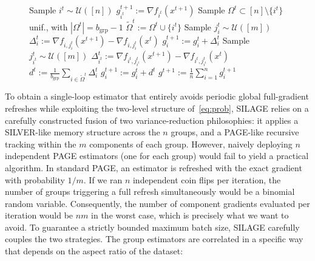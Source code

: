 \documentclass{article}
\newcommand{\cO}{{\cal O}}
\newcommand{\eqdef}{:=}
\newcommand{\rb}[1]{\left(#1\right)}
\theoremstyle{plain}
\newcommand{\algname}[1]{{\sf\scalefont{0.88}\color{mydarkgreen}#1}\xspace}
\newcommand{\algno}{{\sf\scalefont{0.88}\color{mydarkgreen}SILAGE}\xspace}
\def\algname#1{#1}%
\begin{document}
\begin{figure}[t]
\begin{minipage}[t]{0.485\textwidth}
\begin{algorithm}[H]
\begin{algorithmic}[1]
        \STATE Sample $i^t \sim \mathcal{U}([n])$
        \STATE $g_{i^t}^{t+1} \eqdef \nabla f_{i^t}(x^{t+1})$ \hfill {}
        \STATE Sample $\Omega^t \subset [n] \!\setminus \!\{i^t\}$ unif., with $|\Omega^t| = b_{\mathrm{grp}}-1$%
        \STATE $\tilde{\Omega}^t \eqdef \Omega^t \cup \{i^t\}$
            \STATE Sample $j_i^t \sim \mathcal{U}([m])$
            \STATE $\Delta_i^t \eqdef \nabla f_{i,j_i^t}(x^{t+1}) - \nabla f_{i,j_i^t}(x^t)$
            \STATE $g_i^{t+1} \eqdef g_i^t + \Delta_i^t$ \hfill {}
        \ENDFOR
        \STATE Sample $j_{i^t}^t \sim \mathcal{U}([m])$
        \STATE $\Delta_{i^t}^t \eqdef \nabla f_{i^t,j_{i^t}^t}(x^{t+1}) - \nabla f_{i^t,j_{i^t}^t}(x^t)$
        \STATE $d^t \eqdef \frac{1}{b_{\mathrm{grp}}}\sum_{i \in \tilde{\Omega}^t} \Delta_i^t$ \hfill {}
            \STATE $g_i^{t+1} \eqdef g_i^t + d^t$ %
        \ENDFOR
        \STATE $g^{t+1} \eqdef \frac{1}{n}\sum_{i=1}^n g_i^{t+1}$
    \ENDFOR
\end{algorithmic}
\end{algorithm}
\end{minipage}
\end{figure}


To obtain a single-loop estimator that entirely avoids periodic global full-gradient refreshes while exploiting the two-level structure of~\eqref{eq:prob}, \algname{SILAGE} relies on a carefully constructed fusion of two variance-reduction philosophies: it applies a \algname{SILVER}-like memory structure across the $n$ groups, and a \algname{PAGE}-like recursive tracking within the $m$ components of each group. However, naively deploying $n$ independent \algname{PAGE} estimators (one for each group) would fail to yield a practical algorithm. In standard \algname{PAGE}, an estimator is refreshed with the exact gradient with probability $1/m$. If we ran $n$ independent coin flips per iteration, the number of groups triggering a full refresh simultaneously would be a binomial random variable. Consequently, the number of component gradients evaluated per iteration would be $nm$ in the worst case, which is precisely what we want to avoid. %
%
To guarantee a strictly bounded maximum batch size, \algno carefully couples the two strategies. The group estimators are correlated in a specific way
that depends on the aspect ratio of the dataset: %
\end{document}
